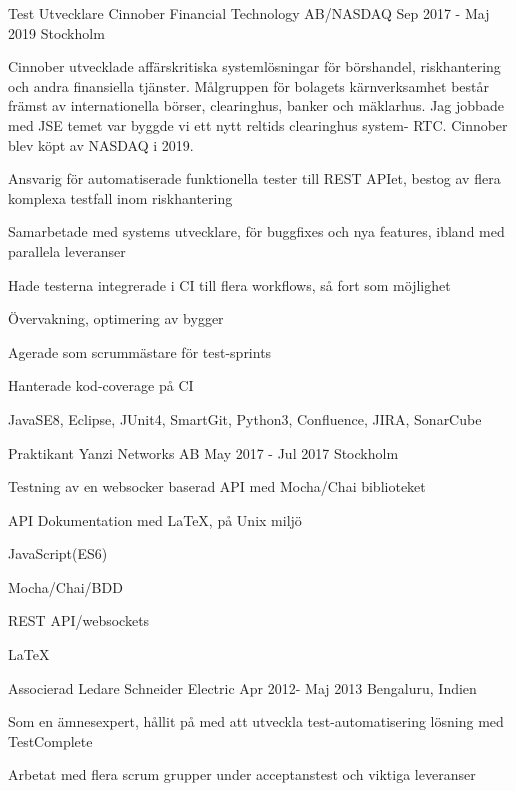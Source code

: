\documentclass[12pt, a4paper]{awesome-cv}
\begin{document}
    \cventry
      {Test Utvecklare}
      {Cinnober Financial Technology AB/NASDAQ}
      {Sep 2017 - Maj 2019}
      {Stockholm}
      {
        \begin{cvparagraph}
            Cinnober utvecklade affärskritiska systemlösningar för börshandel, riskhantering och andra 
            finansiella tjänster. Målgruppen för bolagets kärnverksamhet består främst av internationella börser, 
            clearinghus, banker och mäklarhus. Jag jobbade med JSE temet 
            var byggde vi ett nytt reltids clearinghus system- RTC. Cinnober blev köpt av NASDAQ i 2019. 
        \end{cvparagraph}
        \begin{cvitems}
          \item Ansvarig för automatiserade funktionella tester till REST APIet, bestog av flera komplexa testfall inom riskhantering
          \item Samarbetade med systems utvecklare, för buggfixes och nya features, ibland med parallela leveranser 
          \item Hade testerna integrerade i CI till flera workflows, så fort som möjlighet 
          \item Övervakning, optimering av bygger
          \item Agerade som scrummästare för test-sprints
          \item Hanterade kod-coverage på CI 
          \item JavaSE8, Eclipse, JUnit4, SmartGit, Python3, Confluence, JIRA, SonarCube
        \end{cvitems}
      }

    \cventry
      {Praktikant}
      {Yanzi Networks AB}
      {May 2017 - Jul 2017}
      {Stockholm}
      {
        \begin{cvitems}
          \item Testning av en websocker baserad API med Mocha/Chai biblioteket
          \item API Dokumentation med LaTeX, på Unix miljö
          \item JavaScript(ES6)
          \item Mocha/Chai/BDD
          \item REST API/websockets
          \item LaTeX
          \end{cvitems}
      }


    \cventry
      {Associerad Ledare}
      {Schneider Electric}
      {Apr 2012- Maj 2013}
      {Bengaluru, Indien}
      {
        \begin{cvitems}
          \item Som en ämnesexpert, hållit på med att utveckla test-automatisering lösning med TestComplete
          \item Arbetat med flera scrum grupper under acceptanstest och viktiga leveranser
          \end{cvitems}
      }
\end{document}
